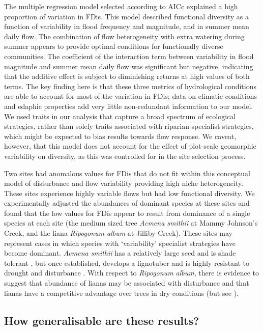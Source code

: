 \documentclass[openright,12pt,a4paper]{memoir}
\begin{document}
The multiple regression model selected according to AICc explained a high proportion of variation in FDis. This model described functional diversity as a function of variability in flood frequency and magnitude, and in summer mean daily flow. The combination of flow heterogeneity with extra watering during summer appears to provide optimal conditions for functionally diverse communities. The coefficient of the interaction term between variability in flood magnitude and summer mean daily flow was significant but negative, indicating that the additive effect is subject to diminishing returns at high values of both terms. The key finding here is that these three metrics of hydrological conditions are able to account for most of the variation in FDis; data on climatic conditions and edaphic properties add very little non-redundant information to our model. We used traits in our analysis that capture a broad spectrum of ecological strategies, rather than solely traits associated with riparian specialist strategies, which might be expected to bias results towards flow response. We caveat, however, that this model does not account for the effect of plot-scale geomorphic variability on diversity, as this was controlled for in the site selection process.
 
Two sites had anomalous values for FDis that do not fit within this conceptual model of disturbance and flow variability providing high niche heterogeneity. These sites experience highly variable flows but had low functional diversity. We experimentally adjusted the abundances of dominant species at these sites and found that the low values for FDis appear to result from dominance of a single species at each site (the medium sized tree \textit{Acmena smithii} at Mammy Johnson’s Creek, and the liana \textit{Ripogonum album} at Jilliby Creek). These sites may represent cases in which species with ‘variability’ specialist strategies have become dominant. \textit{Acmena smithii} has a relatively large seed and is shade tolerant \citep{Melick1990}, but once established, develops a lignotuber and is highly resistant to drought and disturbance \citep{Ashton1976}. With respect to \textit{Ripogonum album}, there is evidence to suggest that abundance of lianas may be associated with disturbance \citep{Laurance2001} and that lianas have a competitive advantage over trees in dry conditions \citep{Swaine2007, Cai2009} (but see \citet{Nepstad2007}).

\subsection*{How generalisable are these results?}
 
\end{document}

